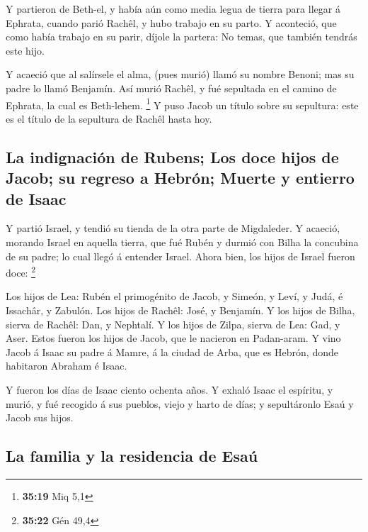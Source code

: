  Y partieron de Beth-el, y había aún como media legua de
tierra para llegar á Ephrata, cuando parió Rachêl, y hubo trabajo en su
parto.  Y aconteció, que como había trabajo en su parir,
díjole la partera: No temas, que también tendrás este hijo.

 Y acaeció que al salírsele el alma, (pues murió) llamó
su nombre Benoni; mas su padre lo llamó Benjamín.  Así
murió Rachêl, y fué sepultada en el camino de Ephrata, la cual es
Beth-lehem. \footnote{\textbf{35:19} Miq 5,1}  Y puso
Jacob un título sobre su sepultura: este es el título de la sepultura de
Rachêl hasta hoy.

\hypertarget{la-indignaciuxf3n-de-rubens-los-doce-hijos-de-jacob-su-regreso-a-hebruxf3n-muerte-y-entierro-de-isaac}{%
\subsection{La indignación de Rubens; Los doce hijos de Jacob; su
regreso a Hebrón; Muerte y entierro de
Isaac}\label{la-indignaciuxf3n-de-rubens-los-doce-hijos-de-jacob-su-regreso-a-hebruxf3n-muerte-y-entierro-de-isaac}}

 Y partió Israel, y tendió su tienda de la otra parte de
Migdaleder.  Y acaeció, morando Israel en aquella tierra,
que fué Rubén y durmió con Bilha la concubina de su padre; lo cual llegó
á entender Israel. Ahora bien, los hijos de Israel fueron doce:
\footnote{\textbf{35:22} Gén 49,4}

 Los hijos de Lea: Rubén el primogénito de Jacob, y
Simeón, y Leví, y Judá, é Issachâr, y Zabulón.  Los hijos
de Rachêl: José, y Benjamín.  Y los hijos de Bilha,
sierva de Rachêl: Dan, y Nephtalí.  Y los hijos de Zilpa,
sierva de Lea: Gad, y Aser. Estos fueron los hijos de Jacob, que le
nacieron en Padan-aram.  Y vino Jacob á Isaac su padre á
Mamre, á la ciudad de Arba, que es Hebrón, donde habitaron Abraham é
Isaac.

 Y fueron los días de Isaac ciento ochenta años.
 Y exhaló Isaac el espíritu, y murió, y fué recogido á
sus pueblos, viejo y harto de días; y sepultáronlo Esaú y Jacob sus
hijos.

\hypertarget{la-familia-y-la-residencia-de-esauxfa}{%
\subsection{La familia y la residencia de
Esaú}\label{la-familia-y-la-residencia-de-esauxfa}}

